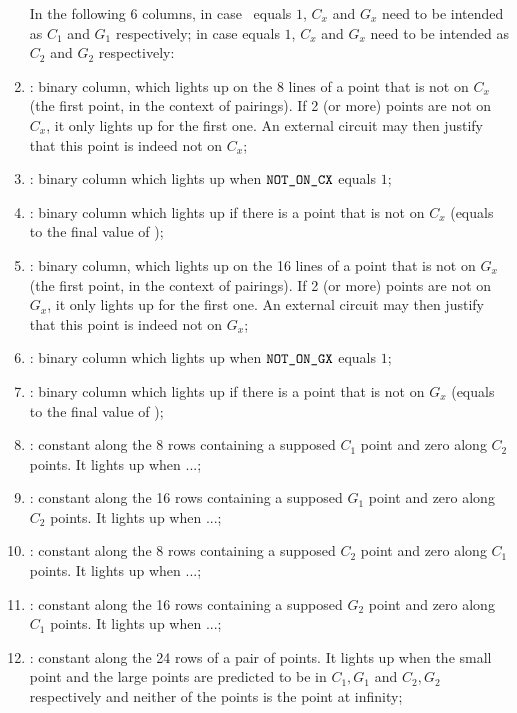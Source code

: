 \begin{enumerate}[resume]
      In the following 6 columns, in case \isFirstInput{} equals $1$, $C_x$ and $G_x$ need to be intended as $C_1$ and $G_1$ respectively; in case \isSecondInput{} equals $1$, $C_x$ and $G_x$ need to be intended as $C_2$ and $G_2$ respectively:

      \item \notOnCX{} \blsPrediction{}: binary column, which lights up on the 8 lines of a point that is not on $C_x$ (the first point, in the context of pairings). If 2 (or more) points are not on $C_x$, it only lights up for the first one. An external circuit may then justify that this point is indeed not on $C_x$;     
      \item \notOnCXAcc: binary column which lights up when $\texttt{NOT\_ON\_CX}$ equals $1$;  
      \item \notOnCXAccMax: binary column which lights up if there is a point that is not on $C_x$ (equals to the final value of \notOnCXAcc);

      \item \notOnGX{ }\blsPrediction{}: binary column, which lights up on the 16 lines of a point that is not on $G_x$ (the first point, in the context of pairings). If 2 (or more) points are not on $G_x$, it only lights up for the first one. An external circuit may then justify that this point is indeed not on $G_x$;
      \item \notOnGXAcc: binary column which lights up when $\texttt{NOT\_ON\_GX}$ equals $1$;
      \item \notOnGXAccMax: binary column which lights up if there is a point that is not on $G_x$ (equals to the final value of \notOnGXAcc);
      
      \item \both{\cOneMembershipTestRequired}:
            constant along the 8 rows containing a supposed $C_1$ point and zero along $C_2$ points. It lights up when ...;
      \item \both{\gOneMembershipTestRequired}:
            constant along the 16 rows containing a supposed $G_1$ point and zero along $C_2$ points. It lights up when ...;
      \item \both{\cTwoMembershipTestRequired}:
            constant along the 8 rows containing a supposed $C_2$ point and zero along $C_1$ points. It lights up when ...;
      \item \both{\gTwoMembershipTestRequired}:
            constant along the 16 rows containing a supposed $G_2$ point and zero along $C_1$ points. It lights up when ...;
      \item \both{\acceptablePairOfPoints}: constant along the 24 rows of a pair of points. It lights up when the small point and the large points are predicted to be in $C_1,G_1$ and $C_2,G_2$ respectively and neither of the points is the point at infinity;
\end{enumerate}
     
